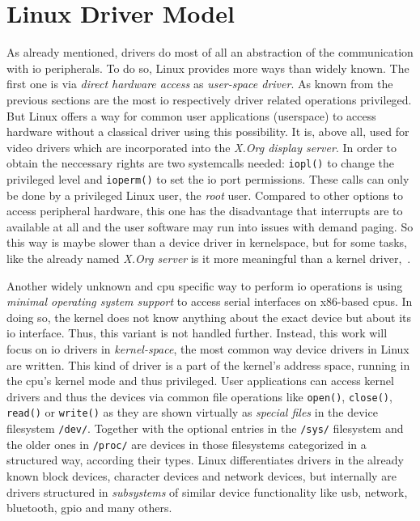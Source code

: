   
\section{Linux Driver Model}
As already mentioned, drivers do most of all an abstraction of the communication with \ac{io} peripherals.
To do so, Linux provides more ways than widely known.
The first one is via \textit{direct hardware access} as \textit{user-space driver}.
As known from the previous sections are the most \ac{io} respectively driver related operations privileged.
But Linux offers a way for common user applications (userspace) to access hardware without a classical driver using this possibility.
It is, above all, used for video drivers which are incorporated into the \textit{X.Org display server}.
In order to obtain the neccessary rights are two systemcalls needed: \texttt{iopl()} to change the privileged level and \texttt{ioperm()} to set the \ac{io} port permissions.
These calls can only be done by a privileged Linux user, the \textit{root} user.
Compared to other options to access peripheral hardware, this one has the disadvantage that interrupts are to available at all and the user software may run into issues with demand paging.
So this way is maybe slower than a device driver in kernelspace, but for some tasks, like the already named \textit{X.Org server} is it more meaningful than a kernel driver\cite{lfd430},~\cite{glatz2015betriebssysteme}.

Another widely unknown and \ac{cpu} specific way to perform \ac{io} operations is using \textit{minimal operating system support} to access serial interfaces on x86-based \acp{cpu}.
In doing so, the kernel does not know anything about the exact device but about its \ac{io} interface\cite{glatz2015betriebssysteme}.
Thus, this variant is not handled further.
Instead, this work will focus on \ac{io} drivers in \textit{kernel-space}, the most common way device drivers in Linux are written.
This kind of driver is a part of the kernel's address space, running in the \ac{cpu}'s kernel mode and thus privileged.
User applications can access kernel drivers and thus the devices via common file operations like \texttt{open()}, \texttt{close()}, \texttt{read()} or \texttt{write()} as they are shown virtually as \textit{special files} in the device filesystem \texttt{/dev/}.
Together with the optional entries in the \texttt{/sys/} filesystem and the older ones in \texttt{/proc/} are devices in those filesystems categorized in a structured way, according their types\cite{glatz2015betriebssysteme}.
Linux differentiates drivers in the already known block devices, character devices and network devices, but internally are drivers structured in \textit{subsystems} of similar device functionality like usb, network, bluetooth, gpio and many others\cite{quade2016Linux}. 

